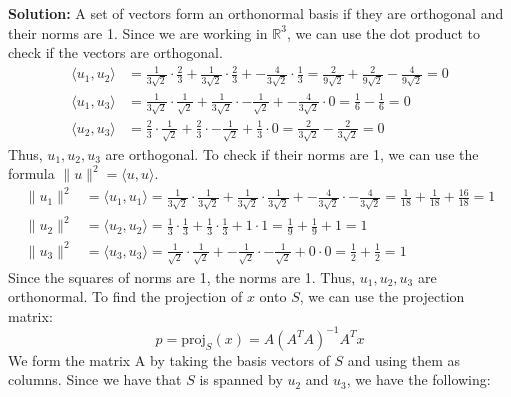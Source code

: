 \documentclass{article}
\begin{document}
\vspace{0.5cm}
\noindent\textbf{Solution:} A set of vectors form an orthonormal basis if they are orthogonal and their norms are 1.
Since we are working in $\mathbb{R}^3$, we can use the dot product to check if the vectors are orthogonal.
\begin{align*}
    \langle u_1, u_2 \rangle &= \frac{1}{3\sqrt{2}} \cdot \frac{2}{3} + \frac{1}{3\sqrt{2}} \cdot \frac{2}{3} + -\frac{4}{3\sqrt{2}} \cdot \frac{1}{3}
    = \frac{2}{9\sqrt{2}} + \frac{2}{9\sqrt{2}} - \frac{4}{9\sqrt{2}} = 0 \\
    \langle u_1, u_3 \rangle &= \frac{1}{3\sqrt{2}} \cdot \frac{1}{\sqrt{2}} + \frac{1}{3\sqrt{2}} \cdot -\frac{1}{\sqrt{2}} + -\frac{4}{3\sqrt{2}} \cdot 0 = \frac{1}{6} - \frac{1}{6} = 0 \\
        \langle u_2, u_3 \rangle &= \frac{2}{3} \cdot \frac{1}{\sqrt{2}} + \frac{2}{3} \cdot -\frac{1}{\sqrt{2}} + \frac{1}{3} \cdot 0 = \frac{2}{3\sqrt{2}} - \frac{2}{3\sqrt{2}} = 0
\end{align*}
Thus, $u_1, u_2, u_3$ are orthogonal.
To check if their norms are 1, we can use the formula $\|u\|^2 = \langle u, u \rangle$.
\begin{align*}
    \|u_1\|^2 &= \langle u_1, u_1 \rangle = \frac{1}{3\sqrt{2}} \cdot \frac{1}{3\sqrt{2}} + \frac{1}{3\sqrt{2}} \cdot \frac{1}{3\sqrt{2}} + -\frac{4}{3\sqrt{2}} \cdot -\frac{4}{3\sqrt{2}} = \frac{1}{18} + \frac{1}{18} + \frac{16}{18} = 1 \\
    \|u_2\|^2 &= \langle u_2, u_2 \rangle = \frac{1}{3} \cdot \frac{1}{3} + \frac{1}{3} \cdot \frac{1}{3} + 1 \cdot 1 = \frac{1}{9} + \frac{1}{9} + 1 = 1 \\
    \|u_3\|^2 &= \langle u_3, u_3 \rangle = \frac{1}{\sqrt{2}} \cdot \frac{1}{\sqrt{2}} + -\frac{1}{\sqrt{2}} \cdot -\frac{1}{\sqrt{2}} + 0 \cdot 0 = \frac{1}{2} + \frac{1}{2} = 1
\end{align*}
Since the squares of norms are 1, the norms are 1. Thus, $u_1, u_2, u_3$ are orthonormal.
To find the projection of $x$ onto $S$, we can use the projection matrix:
$$ p = \text{proj}_S(x) = A (A^T A)^{-1} A^T x $$
We form the matrix A by taking the basis vectors of $S$ and using them as columns.
Since we have that $S$ is spanned by $u_2$ and $u_3$, we have the following:
\end{document}
